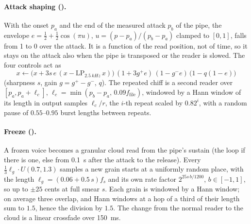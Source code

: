\paragraph{Attack shaping ().} With the onset $p_a$ and the end of the measured attack $p_b$ of the
pipe, the envelope $e = \tfrac12 + \tfrac12\cos(\pi u)$, $u = (p-p_a)/(p_b-p_a)$ clamped to $[0,1]$, falls from 1 to 0
over the attack. It is a function of the read position, not of time, so it stays on the attack also when the pipe
is transposed or the reader is slowed. The four controls act as
\begin{equation}
  x \leftarrow \bigl(x + 3s\,e\,(x - \mathrm{LP}_{\SI{2.5}{kHz}}\,x)\bigr)\,(1+3g^+e)\,(1-g^-e)\,\bigl(1-q(1-e)\bigr)
\end{equation}
(sharpness $s$, gain $g = g^+-g^-$,  $q$). The repeated chiff is a second reader over
$[p_a, p_a + \ell_c]$, $\ell_c = \min(p_b-p_a,\, 0.09f_\mathrm{file})$, windowed by a Hann window of its length in output
samples $\ell_c/r$, the $i$-th repeat scaled by $0.82^i$, with a random pause of $0.55$--$0.95$ burst lengths between
repeats.

\paragraph{Freeze ().} A frozen voice becomes a granular cloud read from the pipe's sustain (the loop
if there is one, else from \SI{0.1}{s} after the attack to the release). Every $\tfrac13\ell_g\cdot U(0.7,1.3)$
samples a new grain starts at a uniformly random place, with the length $\ell_g = (0.06 + 0.5\,s)f_s$ and its own
rate factor $2^{25 s\,b/1200}$, $b\in[-1,1]$, so up to $\pm25$ cents at full smear $s$. Each grain is windowed by a
Hann window; on average three overlap, and Hann windows at a hop of a third of their length sum to $1.5$, hence the
division by $1.5$. The change from the normal reader to the cloud is a linear crossfade over \SI{150}{ms}.


